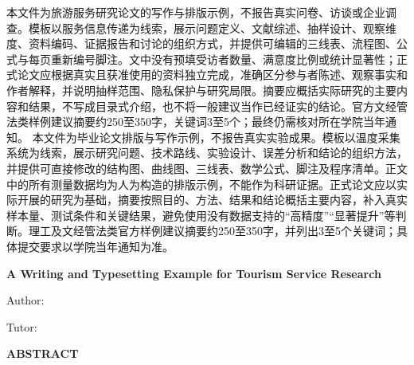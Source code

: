 \documentclass[\HNTcategory]{hntouthesis}
\renewcommand{\hnttitleeng}{Design and Evaluation of a Temperature Measurement System}
\renewcommand{\hnttitleeng}{A Writing and Typesetting Example for a Foreign-Language Thesis}
\renewcommand{\hnttitleeng}{A Writing and Typesetting Example for Tourism Service Research}
\begin{document}
{\song{}
\ifhnthuman
本文件为旅游服务研究论文的写作与排版示例，不报告真实问卷、访谈或企业调查。模板以服务信息传递为线索，展示问题定义、文献综述、抽样设计、观察维度、资料编码、证据报告和讨论的组织方式，并提供可编辑的三线表、流程图、公式与每页重新编号脚注。文中没有预填受访者数量、满意度比例或统计显著性；正式论文应根据真实且获准使用的资料独立完成，准确区分参与者陈述、观察事实和作者解释，并说明抽样范围、隐私保护与研究局限。摘要应概括实际研究的主要内容和结果，不写成目录式介绍，也不将一般建议当作已经证实的结论。官方文经管法类样例建议摘要约250至350字，关键词3至5个；最终仍需核对所在学院当年通知。
\else
本文件为毕业论文排版与写作示例，不报告真实实验成果。模板以温度采集系统为线索，展示研究问题、技术路线、实验设计、误差分析和结论的组织方法，并提供可直接修改的结构图、曲线图、三线表、数学公式、脚注及程序清单。正文中的所有测量数据均为人为构造的排版示例，不能作为科研证据。正式论文应以实际开展的研究为基础，摘要按照目的、方法、结果和结论概括主要内容，补入真实样本量、测试条件和关键结果，避免使用没有数据支持的“高精度”“显著提升”等判断。理工及文经管法类官方样例建议摘要约250至350字，并列出3至5个关键词；具体提交要求以学院当年通知为准。
\fi
\par}

\vspace{0.6em}

\newpage
\begin{center}
{\rmfamily{}\bfseries \hnttitleeng}
\end{center}
\vspace{0.4em}
{\rmfamily{}\hfill Author: \hntauthoreng\par}
{\rmfamily{}\hfill Tutor: \hntadvisoreng\par}
\vspace{0.8em}
\begin{center}
{\rmfamily{}\bfseries ABSTRACT}
\end{center}
\vspace{0.4em}
\end{document}
